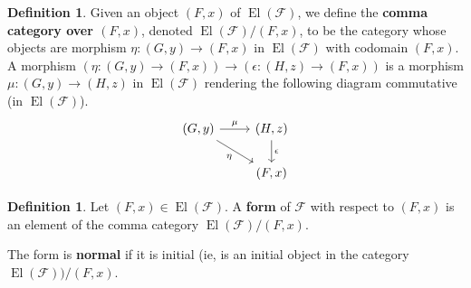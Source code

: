 \documentclass[12pt]{article}
\theoremstyle{plain}
\theoremstyle{definition}
\newtheorem{defn}[thm]{Definition} %
\newcommand{\scr}[1]{\mathscr{#1}}
\newcommand{\lto}{\longrightarrow}
\begin{document}
\begin{defn}
	Given an object $(F,x)$ of $\operatorname{El}(\scr{F})$, we define the \textbf{comma category over $(F,x)$}, denoted $\operatorname{El}(\scr{F})/(F,x)$, to be the category whose objects are morphism $\eta: (G,y) \lto (F,x)$ in $\operatorname{El}(\scr{F})$ with codomain $(F,x)$. A morphism $(\eta: (G,y) \to (F,x)) \lto (\epsilon: (H,z) \to (F,x))$ is a morphism $\mu: (G,y) \lto (H,z)$ in $\operatorname{El}(\scr{F})$ rendering the following diagram commutative (in $\operatorname{El}(\scr{F})$).
	\begin{equation}
		\begin{tikzcd}
			(G,y)\arrow[r,"{\mu}"]\arrow[dr,swap,"{\eta}"] & (H,z)\arrow[d,"{\epsilon}"]\\
			& (F,x)
			\end{tikzcd}
		\end{equation}
	\end{defn}
	\begin{defn}\label{def:forms}
		Let $(F,x) \in \operatorname{El}(\scr{F})$. A \textbf{form} of $\scr{F}$ with respect to $(F,x)$ is an element of the comma category $\operatorname{El}(\scr{F})/(F,x)$.
		
		The form is \textbf{normal} if it is initial (ie, is an initial object in the category $\operatorname{El}(\scr{F}))/(F,x)$.
		\end{defn}
	
\end{document}
